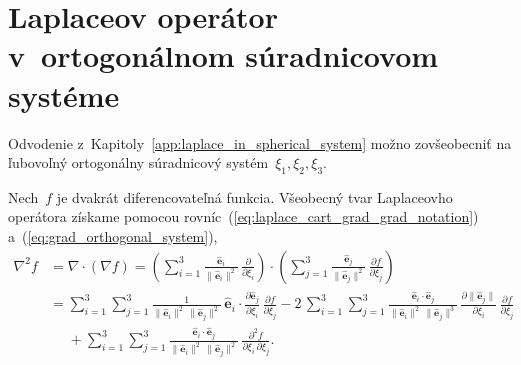 \documentclass[a4paper, 12pt]{book}
\let\vec\mathbf
\begin{document}
\section{Laplaceov operátor v~ortogonálnom súradnicovom systéme}
\label{app:laplace_in_orthogonal_coordinates}

Odvodenie z~Kapitoly~\ref{app:laplace_in_spherical_system} možno zovšeobecniť 
na ľubovoľný ortogonálny súradnicový systém~$\xi_1, \xi_2, \xi_3$.

Nech~$f$ je dvakrát diferencovateľná funkcia.  Všeobecný tvar Laplaceovho 
operátora získame pomocou rovníc~(\ref{eq:laplace_cart_grad_grad_notation}) 
a~(\ref{eq:grad_orthogonal_system}),
%
\begin{equation}
\label{eq:laplace_orthogonal_system_1}
\begin{split}
\nabla^2 f &= \nabla \cdot \left( \nabla f \right) = \left( \sum_{i = 1}^3 
\frac{\hat{\vec e}_i}{\| \hat{\vec e}_i \|^2} \, \frac{\partial}{\partial 
\xi_i}\right) \cdot \left( \sum_{j = 1}^3 \frac{\hat{\vec e}_j}{\| \hat{\vec 
e}_j \|^2} \, \frac{\partial f}{\partial \xi_j}
\right)\\
%
&= \sum_{i = 1}^{3} \sum_{j = 1}^3 \frac{1}{\| \hat{\vec e}_i \|^2 \, \| 
\hat{\vec e}_j \|^2} \, \hat{\vec e}_i \cdot \frac{\partial \hat{\vec 
e}_j}{\partial \xi_i} \, \frac{\partial f}{\partial \xi_j}
- 2\, \sum_{i = 1}^{3} \sum_{j = 1}^3 \frac{\hat{\vec e}_i \cdot \hat{\vec 
e}_j}{\| \hat{\vec e}_i \|^2 \, \|\hat{\vec e}_j \|^3} \, \frac{\partial \| 
\hat{\vec e}_j \|}{\partial \xi_i} \, \frac{\partial f}{\partial \xi_j}\\
%
&\phantom{={}}+ \sum_{i = 1}^{3} \sum_{j = 1}^3 \frac{\hat{\vec e}_i \cdot 
\hat{\vec e}_j}{\| \hat{\vec e}_i \|^2 \, \| \hat{\vec e}_j \|^2} \, 
\frac{\partial^2 f}{\partial \xi_i \, \partial \xi_j}{.}
\end{split}
%
\end{equation}
\end{document}
